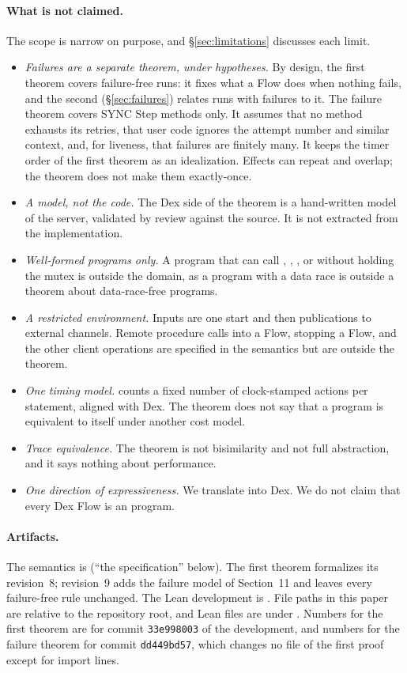 \paragraph{What is not claimed.}
The scope is narrow on purpose, and \S\ref{sec:limitations} discusses each
limit.
\begin{itemize}
\item \emph{Failures are a separate theorem, under hypotheses.} By
  design, the first theorem covers failure-free runs: it fixes what a Flow
  does when nothing fails, and the second (\S\ref{sec:failures}) relates
  runs with failures to it. The failure theorem covers SYNC Step methods
  only. It assumes that no method exhausts its retries, that user code
  ignores the attempt number and similar context, and, for liveness, that
  failures are finitely many. It keeps the timer order of the first
  theorem as an idealization. Effects can repeat and overlap; the theorem
  does not make them exactly-once.
\item \emph{A model, not the code.} The Dex side of the theorem is a
  hand-written model of the server, validated by review against the source.
  It is not extracted from the implementation.
\item \emph{Well-formed programs only.} A program that can call
  , , , or  without holding the
  mutex is outside the domain, as a program with a data race is outside a
  theorem about data-race-free programs.
\item \emph{A restricted environment.} Inputs are one start and then
  publications to external channels. Remote procedure calls into a Flow,
  stopping a Flow, and the other client operations are specified in the
  semantics but are outside the theorem.
\item \emph{One timing model.} \Lang{} counts a fixed number of clock-stamped
  actions per statement, aligned with Dex. The theorem does not say that a
  program is equivalent to itself under another cost model.
\item \emph{Trace equivalence.} The theorem is not bisimilarity and not full
  abstraction, and it says nothing about performance.
\item \emph{One direction of expressiveness.} We translate \Lang{} into Dex.
  We do not claim that every Dex Flow is an \Lang{} program.
\end{itemize}

\paragraph{Artifacts.}
The semantics is  (``the
specification'' below). The first theorem formalizes its revision~8;
revision~9 adds the failure model of Section~11 and leaves every
failure-free rule unchanged. The Lean development is .
File paths in this paper are relative to the repository root, and Lean
files are under . Numbers for the
first theorem are for commit \texttt{33e998003} of the development, and
numbers for the failure theorem for commit \texttt{dd449bd57}, which
changes no file of the first proof except for import lines.
